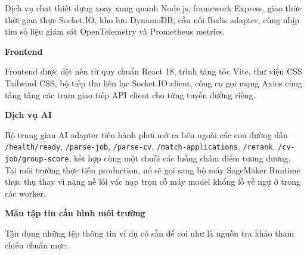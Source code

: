 Dịch vụ chat thiết dựng xoay xung quanh Node.js, framework Express, giao
thức thời gian thực Socket.IO, kho lưu DynamoDB, cầu nối Redis adapter,
cùng nhịp tim số liệu giám sát OpenTelemetry và Prometheus metrics.

\vspace{0.5em}\noindent\textbf{Frontend}\par

\begin{Shaded}
\begin{Highlighting}[]
\end{Highlighting}
\end{Shaded}

Frontend được dệt nên từ quy chuẩn React 18, trình tăng tốc Vite, thư
viện CSS Tailwind CSS, bộ tiếp thu liên lạc Socket.IO client, công cụ
gọi mạng Axios cùng tầng tầng các trạm giao tiếp API client cho từng
tuyến đường riêng.

\vspace{0.5em}\noindent\textbf{Dịch vụ AI}\par

\begin{Shaded}
\begin{Highlighting}[]
\end{Highlighting}
\end{Shaded}

Bộ trung gian AI adapter tiến hành phơi mở ra bên ngoài các con đường
dẫn \texttt{/\allowbreak{}health/\allowbreak{}ready}, \texttt{/\allowbreak{}parse-\allowbreak{}job}, \texttt{/\allowbreak{}parse-\allowbreak{}cv},
\texttt{/\allowbreak{}match-\allowbreak{}applications}, \texttt{/\allowbreak{}rerank},
\texttt{/\allowbreak{}cv-\allowbreak{}job/\allowbreak{}group-\allowbreak{}score}, kết hợp cùng một chuỗi các luồng chấm điểm
tương đương. Tại môi trường thực tiễn production, nó sẽ gọi sang bộ máy
SageMaker Runtime thực thụ thay vì nặng nề lôi vác nạp trọn cỗ máy model
khổng lồ về ngự ở trong các worker.

\vspace{0.5em}\noindent\textbf{Mẫu tập tin cấu hình môi
trường}\par

Tận dụng những tệp thông tin ví dụ có sẵn để coi như là nguồn tra khảo
tham chiếu chuẩn mực:

